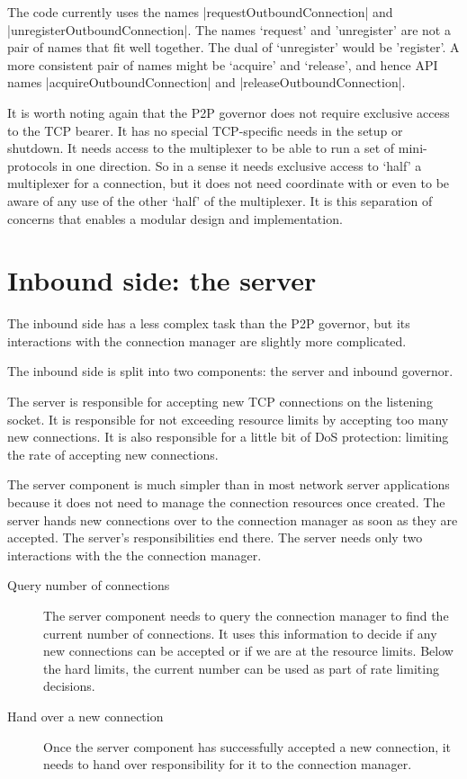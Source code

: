 \begin{designalternative}
The code currently uses the names |requestOutboundConnection| and
|unregisterOutboundConnection|. The names `request' and 'unregister' are not a
pair of names that fit well together. The dual of `unregister' would be
'register'. A more consistent pair of names might be `acquire' and `release',
and hence API names |acquireOutboundConnection| and |releaseOutboundConnection|.
\end{designalternative}

It is worth noting again that the P2P governor does not require exclusive
access to the TCP bearer. It has no special TCP-specific needs in the setup or
shutdown.
It needs access to the multiplexer to be able to run a set of
mini-protocols in one direction. So in a sense it needs exclusive access to
`half' a multiplexer for a connection, but it does not need coordinate with or
even to be aware of any use of the other `half' of the multiplexer. It is this
separation of concerns that enables a modular design and implementation.


\section{Inbound side: the server}

The inbound side has a less complex task than the P2P governor, but its
interactions with the connection manager are slightly more complicated.

The inbound side is split into two components: the server and inbound governor.

The server is responsible for accepting new TCP connections on the listening
socket. It is responsible for not exceeding resource limits by accepting too
many new connections. It is also responsible for a little bit of DoS protection:
limiting the rate of accepting new connections.

The server component is much simpler than in most network server applications
because it does not need to manage the connection resources once created. The
server hands new connections over to the connection manager as soon as they are
accepted. The server's responsibilities end there. The server needs only two
interactions with the the connection manager.
\begin{description}
\item[Query number of connections] The server component needs to query the
  connection manager to find the current number of connections. It uses this
  information to decide if any new connections can be accepted or if we are
  at the resource limits. Below the hard limits, the current number can be used
  as part of rate limiting decisions.

\item[Hand over a new connection] Once the server component has successfully
  accepted a new connection, it needs to hand over responsibility for it to
  the connection manager.
\end{description}


